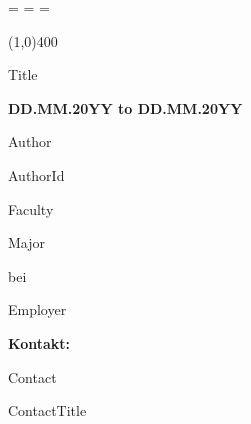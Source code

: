 \newcommand*{\getTitleGer}{Title}
\newcommand*{\getFaculty}{Faculty}
\newcommand*{\getMajor}{Major}
\newcommand*{\getAuthor}{Author}
\newcommand*{\getAuthorId}{AuthorId}
\newcommand*{\getDuration}{DD.MM.20YY to DD.MM.20YY}
\newcommand*{\getEmplyer}{Employer}
\newcommand*{\getContact}{Contact}
\newcommand*{\getContactTitle}{ContactTitle}






\begin{titlepage}
    \oddsidemargin=\evensidemargin\relax
    \textwidth=\dimexpr{}\evensidemargin-2in\relax
    \hsize=\textwidth\relax
    
    \centering
    

    \line(1,0){400}

    \vspace{0,5cm}
    
    {\huge \getTitleGer{}}
    
    \vspace{1cm}
    
    \textbf{\getDuration{}}
    
    \vspace{1cm}
    
    \getAuthor{}
    \vspace{0,25cm}
    
    \getAuthorId{}
    \vspace{0,5cm}
    
    \getFaculty{}
    \vspace{0,25cm}
    
    \getMajor{}
    \vspace{1cm}
    
    bei 
    
    \vspace{1cm}
    
    \getEmplyer{}
    
    \vspace{0,5cm}
    
    
    \textbf{Kontakt:}
    
    \vspace{0,25cm}
    

    \getContact{}
    
    \vspace{0,25cm}
    
    \getContactTitle{}
  
\end{titlepage}